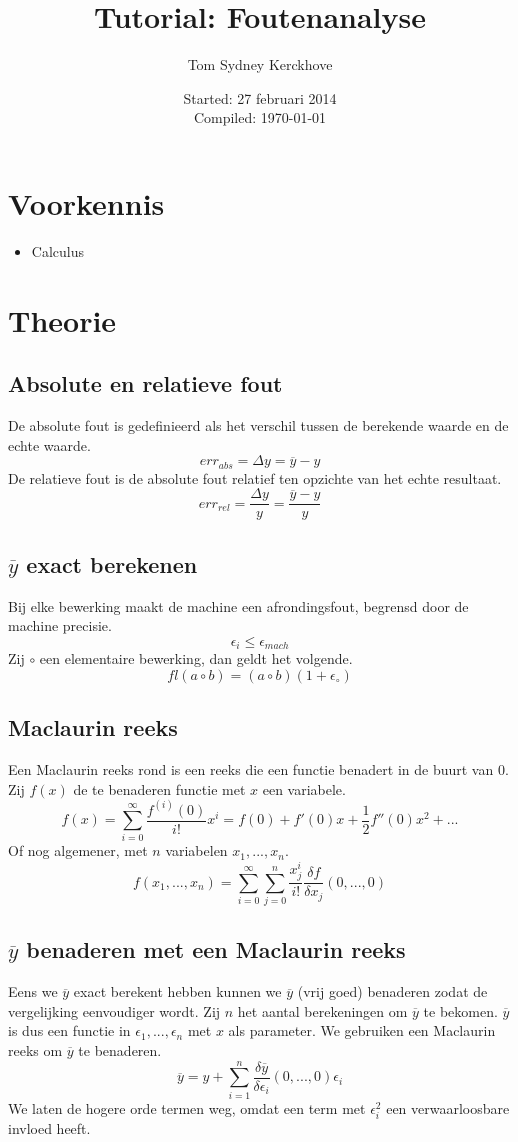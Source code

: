 \documentclass[12pt,a4paper]{article}
\author{Tom Sydney Kerckhove}
\title{Tutorial: Foutenanalyse}
\date{Started: 27 februari 2014\\ Compiled: \today}
\begin{document}
\maketitle
\tableofcontents

\section{Voorkennis}
\begin{itemize}
\item Calculus
\end{itemize}

\pagebreak

\section{Theorie}
\subsection{Absolute en relatieve fout}
De absolute fout is gedefinieerd als het verschil tussen de berekende waarde en de echte waarde.
\[
err_{abs} = \Delta y = \overline{y} - y
\]
De relatieve fout is de absolute fout relatief ten opzichte van het echte resultaat.
\[
err_{rel} = \frac{\Delta y}{y} = \frac{\overline{y} - y}{y}
\]

\subsection{$\overline{y}$ exact berekenen}
Bij elke bewerking maakt de machine een afrondingsfout, begrensd door de machine precisie.
\[
\epsilon_i \le \epsilon_{mach}
\]
Zij $\circ$ een elementaire bewerking, dan geldt het volgende.
\[
fl(a\circ b) = (a\circ b)(1+\epsilon_{\circ})
\]

\subsection{Maclaurin reeks}
Een Maclaurin reeks rond is een reeks die een functie benadert in de buurt van $0$. Zij $f(x)$ de te benaderen functie met $x$ een variabele.
\[
f(x) = \sum_{i=0}^\infty\frac{f^{(i)}(0)}{i!}x^i = f(0) + f'(0)x + \frac{1}{2}f''(0)x^2 + ...
\]
Of nog algemener, met $n$ variabelen $x_1,...,x_n$.
\[
f(x_1,...,x_n) = \sum_{i=0}^\infty\sum_{j=0}^{n}\frac{x_j^i}{i!}\frac{\delta f}{\delta x_j}(0,...,0)
\]

\subsection{$\overline{y}$ benaderen met een Maclaurin reeks}
Eens we $\overline{y}$ exact berekent hebben kunnen we $\overline{y}$ (vrij goed) benaderen zodat de vergelijking eenvoudiger wordt. Zij $n$ het aantal berekeningen om $\overline{y}$ te bekomen. $\overline{y}$ is dus een functie in $\epsilon_1,...,\epsilon_n$ met $x$ als parameter. We gebruiken een Maclaurin reeks om $\overline{y}$ te benaderen.
\[
\overline{y} = y + \sum_{i=1}^{n}\frac{\delta\overline{y}}{\delta\epsilon_i}(0,...,0)\epsilon_i
\]
We laten de hogere orde termen weg, omdat een term met $\epsilon_{i}^2$ een verwaarloosbare invloed heeft. 
\end{document}
